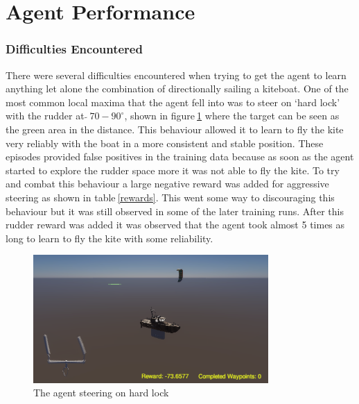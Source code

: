 




\section{Agent Performance}

\subsubsection*{Difficulties Encountered}
There were several difficulties encountered when trying to get the agent to learn anything let alone the combination of directionally sailing a kiteboat. One of the most common local maxima that the agent fell into was to steer on `hard lock' with the rudder at \textit{$\tilde{} ~70-90^{\circ}$}, shown in figure$~$\ref{hard_lock} where the target can be seen as the green area in the distance. This behaviour allowed it to learn to fly the kite very reliably with the boat in a more consistent and stable position. These episodes provided false positives in the training data because as soon as the agent started to explore the rudder space more it was not able to fly the kite. To try and combat this behaviour a large negative reward was added for aggressive steering as shown in table$~$\ref{rewards}. This went some way to discouraging this behaviour but it was still observed in some of the later training runs. After this rudder reward was added it was observed that the agent took almost 5 times as long to learn to fly the kite with some reliability. 
\begin{figure}[!htb]
    \centering
    \includegraphics[width=0.8\textwidth]{Images/hard_lock.png}
    \caption{The agent steering on hard lock}\label{hard_lock}
\end{figure}

